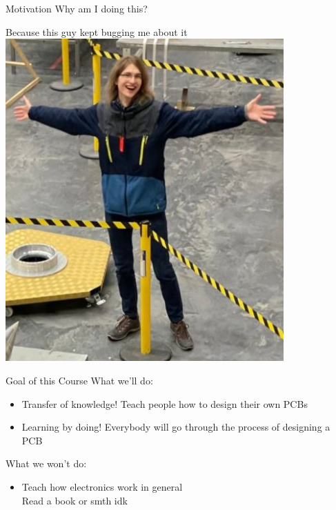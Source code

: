 \documentclass{beamer}
\begin{document}
\begin{frame}{Motivation}
  Why am I doing this?\\
  \pause
  \vspace{1cm}
  \begin{center}
  Because this guy kept bugging me about it\\
  \includegraphics[width=0.8\textwidth]{images/philip.jpg}
  \end{center}
\end{frame}

\begin{frame}{Goal of this Course}
  What we'll do:
  \begin{itemize}
    \item Transfer of knowledge! Teach people how to design their own PCBs
    \item Learning by doing! Everybody will go through the process of designing a PCB
  \end{itemize}
  What we won't do:
  \begin{itemize}
    \item Teach how electronics work in general\\
    \pause Read a book or smth idk
  \end{itemize}
\end{frame}
\end{document}

